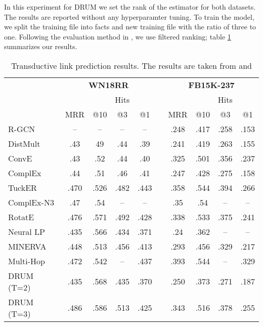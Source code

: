 \documentclass{article}
\begin{document}
In this experiment for DRUM we set the rank of the estimator  for both datasets. The results are reported without any hyperparamter tuning. To train the model, we split the training file into facts and new training file with the ratio of three to one. Following the evaluation method in \citet{bordes2013translating}, we use filtered ranking; table \ref{tab:tran} summarizes our results. 


\begin{table}[h!]
    \centering  
    \caption{Transductive link prediction results. The results are taken from \cite{lacroix2018canonical, yang2017differentiable} and \cite{sun2018rotate}}
    \label{tab:tran}
    \begin{tabular}{lccccccccc}
        \toprule
         & \multicolumn{4}{c}{\textbf{WN18RR}} & & \multicolumn{4}{c}{\textbf{FB15K-237}} 
        \\
        \cmidrule{2-5} \cmidrule{7-10}
         & & \multicolumn{3}{c}{Hits} & & & \multicolumn{3}{c}{Hits}
        \\
        \cmidrule{3-5} \cmidrule{8-10}
         & MRR & @10 & @3 & @1 & & MRR & @10 & @3 & @1 
        \\
        \midrule
        R-GCN \citep{schlichtkrull2018modeling} & -- & -- & -- & -- & & .248 & .417 & .258 & .153
        \\
        DistMult \citep{Yang2015EmbeddingEA} & .43 & 49 & .44 & .39 & & .241 & .419 & .263 & .155
        \\
        ConvE \citep{dettmers2018convolutional} & .43 & .52 & .44 & .40 & & .325 & .501 & .356 & .237
        \\
        ComplEx \citep{pmlr-v48-trouillon16} & .44 & .51 & .46 & .41 & & .247 & .428 & .275 & .158
        \\
        TuckER \citep{balavzevic2019tucker} & .470 & .526 & .482 & .443 & & .358 & .544 & .394 & .266\\
        ComplEx-N3 \citep{lacroix2018canonical} & .47 & .54 & -- & -- & & .35 & .54 & -- & --
        \\
        RotatE \citep{sun2018rotate} & .476 & .571 & .492 & .428 & & .338 & .533 & .375 & .241
        \\
        \midrule
        Neural LP \citep{yang2017differentiable} & .435 & .566 & .434 & .371 & & .24 & .362 & -- & --
        \\
        MINERVA \citep{das2018go} & .448 & .513 & .456 & .413 & & .293 & .456 & .329 & .217
        \\
        Multi-Hop \citep{lin2018multi} & .472 & .542 & -- & .437 & & .393 & .544 & -- & .329
        \\
DRUM (T=2) & .435 & .568 & .435 & .370 & & .250 & .373 & .271 & .187
        \\ 
        DRUM (T=3) & .486 & .586 & .513 & .425 & & .343 & .516 & .378 & .255 
        \\ 
        \bottomrule
    \end{tabular}
\end{table}
\end{document}

